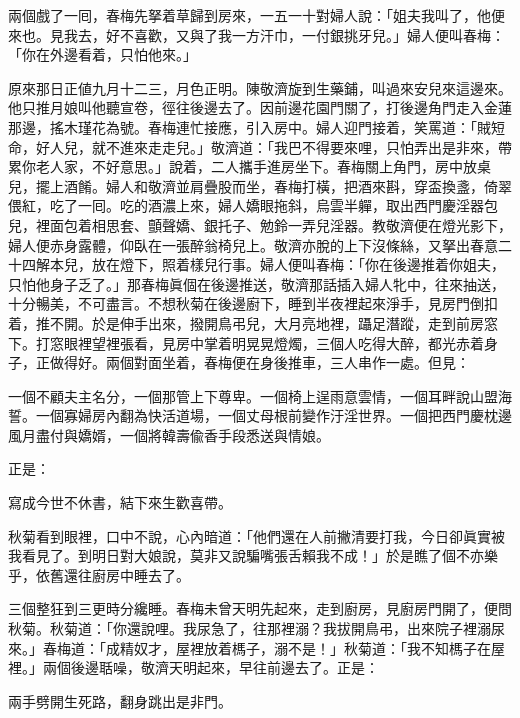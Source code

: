 兩個戲了一囘，春梅先拏着草歸到房來，一五一十對婦人說：「姐夫我叫了，他便來也。見我去，好不喜歡，又與了我一方汗巾，一付銀挑牙兒。」婦人便叫春梅：「你在外邊看着，只怕他來。」

原來那日正値九月十二三，月色正明。陳敬濟旋到生藥鋪，叫過來安兒來這邊來。他只推月娘叫他聽宣卷，徑往後邊去了。因前邊花園門關了，打後邊角門走入金蓮那邊，搖木瑾花為號。春梅連忙接應，引入房中。婦人迎門接着，笑罵道：「賊短命，好人兒，就不進來走走兒。」敬濟道：「我巴不得要來哩，只怕弄出是非來，帶累你老人家，不好意思。」說着，二人攜手進房坐下。春梅關上角門，房中放桌兒，擺上酒餚。婦人和敬濟並肩疊股而坐，春梅打橫，把酒來斟，穿盃換盞，倚翠偎紅，吃了一囘。吃的酒濃上來，婦人嬌眼拖斜，烏雲半軃，取出西門慶淫器包兒，裡面包着相思套、顫聲嬌、銀托子、勉鈴一弄兒淫器。{}教敬濟便在燈光影下，婦人便赤身露體，仰臥在一張醉翁椅兒上。敬濟亦脫的上下沒條絲，又拏出春意二十四解本兒，放在燈下，照着樣兒行事。婦人便叫春梅：「你在後邊推着你姐夫，只怕他身子乏了。」那春梅眞個在後邊推送，敬濟那話插入婦人牝中，往來抽送，十分暢美，不可盡言。不想秋菊在後邊廚下，睡到半夜裡起來淨手，見房門倒扣着，推不開。於是伸手出來，撥開鳥弔兒，大月亮地裡，躡足潛蹤，走到前房窓下。打窓眼裡望裡張看，見房中掌着明晃晃燈燭，三個人吃得大醉，都光赤着身子，正做得好。兩個對面坐着，春梅便在身後推車，三人串作一處。{}但見：

\begin{myquote}
一個不顧夫主名分，一個那管上下尊卑。一個椅上逞雨意雲情，一個耳畔說山盟海誓。一個寡婦房內翻為快活道場，一個丈母根前變作汙淫世界。一個把西門慶枕邊風月盡付與嬌婿，一個將韓壽偸香手段悉送與情娘。
\end{myquote}

正是：

\begin{myquote}
寫成今世不休書，結下來生歡喜帶。
\end{myquote}

秋菊看到眼裡，口中不說，心內暗道：「他們還在人前撇清要打我，今日卻眞實被我看見了。到明日對大娘說，莫非又說騙嘴張舌賴我不成！」{}於是瞧了個不亦樂乎，依舊還往廚房中睡去了。

三個整狂到三更時分纔睡。春梅未曾天明先起來，走到廚房，見廚房門開了，便問秋菊。秋菊道：「你還說哩。我尿急了，往那裡溺？我拔開鳥弔，出來院子裡溺尿來。」{}春梅道：「成精奴才，屋裡放着榪子，溺不是！」秋菊道：「我不知榪子在屋裡。」兩個後邊聒噪，敬濟天明起來，早往前邊去了。正是：

\begin{myquote}
兩手劈開生死路，翻身跳出是非門。
\end{myquote}

